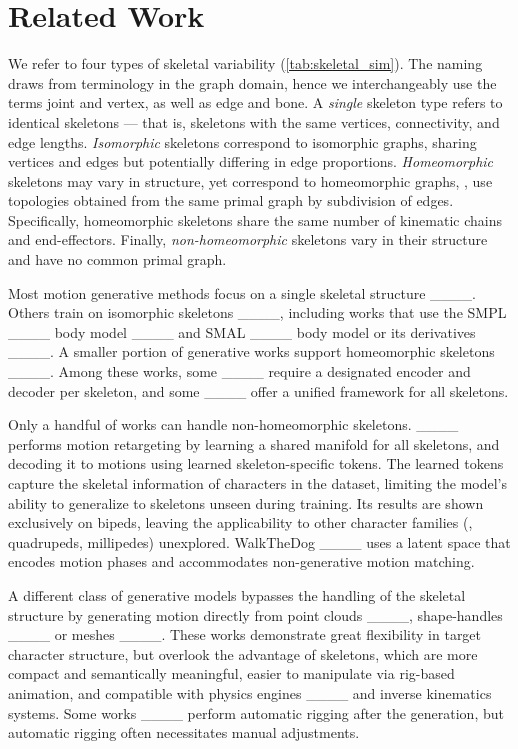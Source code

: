 \section{Related Work}
\label{sec:related_work}




We refer to four types of skeletal variability (\cref{tab:skeletal_sim}). The naming draws from terminology in the graph domain, hence we interchangeably use the terms joint and vertex, as well as edge and bone. 
A \emph{single} skeleton type refers to identical skeletons — that is, skeletons with the same vertices, connectivity, and edge lengths.
\emph{Isomorphic} skeletons correspond to isomorphic graphs, sharing vertices and edges but potentially differing in edge proportions.
\emph{Homeomorphic} skeletons may vary in structure, yet correspond to homeomorphic graphs, \ie,
use topologies obtained from the same primal graph by subdivision of edges. Specifically, homeomorphic skeletons share the same number of kinematic chains and end-effectors.
Finally, \emph{non-homeomorphic} skeletons vary in their structure and have no common primal graph. 

Most motion generative methods focus on a single skeletal structure ____. Others train on isomorphic skeletons ____, including works that use the SMPL ____ 
body model
____ and SMAL ____ 
body model
or its derivatives ____. A smaller portion of generative works support homeomorphic skeletons ____. Among these works, some ____ require a designated encoder and decoder per skeleton, and some ____ 
offer a unified framework for all skeletons.

Only a handful of works can handle non-homeomorphic skeletons. ____ performs motion retargeting by learning a shared manifold for all skeletons, and decoding it to motions using learned skeleton-specific tokens.
The learned tokens capture the skeletal information of characters in the dataset, 
limiting the model's ability to generalize to skeletons unseen during training. Its results are shown exclusively on bipeds, leaving the applicability to other character families (\eg, quadrupeds, millipedes) unexplored.
WalkTheDog ____ uses a latent space that encodes motion phases and accommodates non-generative motion matching. 

A different class of generative models bypasses the handling of the skeletal structure by generating motion directly from point clouds ____, shape-handles ____ or meshes ____. These works demonstrate great flexibility in target character structure, but overlook the advantage of skeletons, which are more compact and semantically meaningful, easier to manipulate via rig-based animation, and compatible with physics engines ____ and inverse kinematics systems. Some works ____ perform automatic rigging after the generation, but automatic rigging often necessitates manual adjustments.

